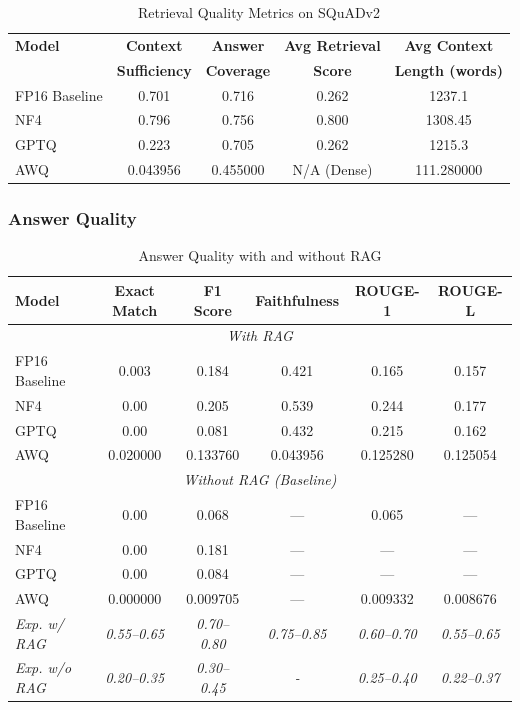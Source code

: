 \begin{table}[h]
\centering
\caption{Retrieval Quality Metrics on SQuADv2}
\label{tab:retrieval_quality}
\begin{tabular}{@{}lcccc@{}}
\toprule
\textbf{Model} & \textbf{Context} & \textbf{Answer} & \textbf{Avg Retrieval} & \textbf{Avg Context} \\
 & \textbf{Sufficiency} & \textbf{Coverage} & \textbf{Score} & \textbf{Length (words)} \\
\midrule
FP16 Baseline & 0.701 & 0.716 & 0.262 & 1237.1 \\
NF4 & 0.796 & 0.756 & 0.800 & 1308.45 \\
GPTQ & 0.223 & 0.705 & 0.262 & 1215.3 \\
AWQ & 0.043956 & 0.455000 & N/A (Dense) & 111.280000 \\
\bottomrule
\end{tabular}
\end{table}

\subsubsection{Answer Quality}

\begin{table}[h]
\centering
\caption{Answer Quality with and without RAG}
\label{tab:answer_quality}
\begin{tabular}{@{}lccccc@{}}
\toprule
\textbf{Model} & \textbf{Exact Match} & \textbf{F1 Score} & \textbf{Faithfulness} & \textbf{ROUGE-1} & \textbf{ROUGE-L} \\
\midrule
\multicolumn{6}{c}{\textit{With RAG}} \\
\midrule
FP16 Baseline & 0.003 & 0.184 & 0.421 & 0.165 & 0.157 \\
NF4 & 0.00 & 0.205 & 0.539 & 0.244 & 0.177 \\
GPTQ & 0.00 & 0.081 & 0.432 & 0.215 & 0.162 \\
AWQ & 0.020000 & 0.133760 & 0.043956 & 0.125280 & 0.125054 \\
\midrule
\multicolumn{6}{c}{\textit{Without RAG (Baseline)}} \\
\midrule
FP16 Baseline & 0.00 & 0.068& --- & 0.065 & --- \\
NF4 & 0.00 & 0.181 & --- & --- & --- \\
GPTQ & 0.00 & 0.084 & --- & --- & --- \\
AWQ & 0.000000 & 0.009705 & --- & 0.009332 & 0.008676 \\
\midrule
\textit{Exp. w/ RAG} & \textit{0.55--0.65} & \textit{0.70--0.80} & \textit{0.75--0.85} & \textit{0.60--0.70} & \textit{0.55--0.65} \\
\textit{Exp. w/o RAG} & \textit{0.20--0.35} & \textit{0.30--0.45} & \textit{-} & \textit{0.25--0.40} & \textit{0.22--0.37} \\
\bottomrule
\end{tabular}
\end{table}

